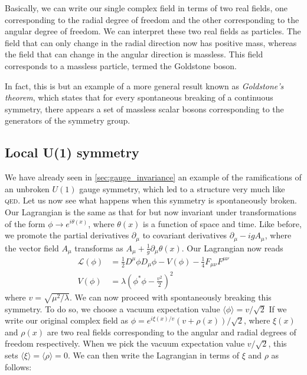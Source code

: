 Basically, we can write our single complex field in terms of two real fields, one corresponding to the radial degree of freedom and the other corresponding to the angular degree of freedom. We can interpret these two real fields as particles. The field that can only change in the radial direction now has positive mass, whereas the field that can change in the angular direction is massless. This field corresponds to a massless particle, termed the Goldstone boson.

In fact, this is but an example of a more general result known as \emph{Goldstone's theorem}, which states that for every spontaneous breaking of a continuous symmetry, there appears a set of massless scalar bosons corresponding to the generators of the symmetry group.

\subsection{Local U(1) symmetry}

We have already seen in \autoref{sec:gauge_invariance} an example of the ramifications of an unbroken $U(1)$ gauge symmetry, which led to a structure very much like \textsc{qed}. Let us now see what happens when this symmetry is spontaneously broken. Our Lagrangian is the same as that for but now invariant under transformations of the form $\phi\rightarrow e^{i\theta(x)}$, where $\theta(x)$ is a function of space and time.  Like before, we promote the partial derivatives $\partial_\mu$ to covariant derivatives $\partial_\mu - igA_\mu$, where the vector field $A_\mu$ transforms as $A_\mu + \frac{1}{g}\partial_\mu\theta(x)$. Our Lagrangian now reads
\begin{align}
\mathcal{L}(\phi) &= \frac{1}{2} D^\mu\phi D_\mu\phi - V(\phi)-\frac{1}{4}F_{\mu\nu}F^{\mu\nu}\\
V(\phi) &= \lambda\left(\phi^*\phi - \frac{v^2}{2}\right)^2
\end{align}
where $v = \sqrt{\mu^2/\lambda}$. We can now proceed with spontaneously breaking this symmetry. To do so, we choose a vacuum expectation value $\langle\phi\rangle = v/\sqrt{2}$ If we write our original complex field as $\phi = e^{i\xi(x)/v}(v+\rho(x))/\sqrt{2}$, where $\xi(x)$ and $\rho(x)$ are two real fields corresponding to the angular and radial degrees of freedom respectively. When we pick the vacuum expectation value $v/\sqrt{2}$, this sets $\langle\xi\rangle = \langle\rho\rangle=0$. We can then write the Lagrangian in terms of $\xi$ and $\rho$ as follows:

